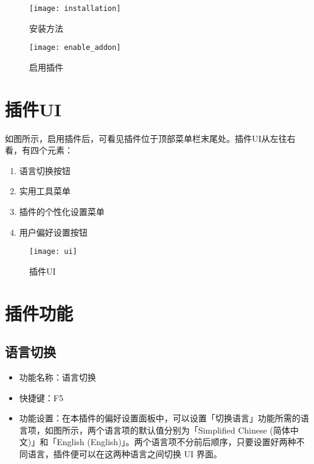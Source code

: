 \documentclass{../../public_resources/doc}
\begin{document}
\begin{figure}[h!]
    \begin{minipage}[t]{0.48\linewidth}
        \texttt{[image: installation]}
        \caption{安装方法}
    \end{minipage}
    \quad
    \begin{minipage}[t]{0.48\linewidth}
        \texttt{[image: enable\_addon]}
        \caption{启用插件}
        \label{启用插件}
    \end{minipage}
\end{figure}

\newpage
\section{插件UI}
\label{插件UI小节}
如图所示，启用插件后，可看见插件位于顶部菜单栏末尾处。插件UI从左往右看，有四个元素：
\begin{enumerate}
    \item 语言切换按钮
    \item 实用工具菜单
    \item 插件的个性化设置菜单
    \item 用户偏好设置按钮
\end{enumerate}

\begin{figure}[h!]
    \texttt{[image: ui]}
    \caption{插件UI}
    \label{插件UI}
\end{figure}

\section{插件功能}
\hypertarget{AddonFeatures}{}

\subsection{语言切换}
\begin{itemize}
    \item 功能名称：语言切换
    \item 快捷键：F5
    \item 功能设置：在本插件的偏好设置面板中，可以设置「切换语言」功能所需的语言项，如图所示，两个语言项的默认值分别为「Simplified Chinese (简体中文)」和「English (English)」。两个语言项不分前后顺序，只要设置好两种不同语言，插件便可以在这两种语言之间切换 UI 界面。
\end{itemize}
\end{document}
